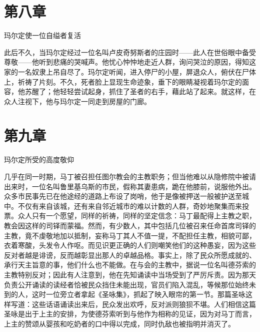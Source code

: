 \section{第八章}

玛尔定使一位自缢者复活\par

此后不久，当玛尔定经过一位名叫卢皮奇努斯者的庄园时——此人在世俗眼中备受尊敬——他听到悲痛的哭喊声。他忧心忡忡地走近人群，询问哭泣的原因，得知这家的一名奴隶上吊自尽了。玛尔定听闻，进入停尸的小屋，屏退众人，俯伏在尸体上，祈祷了片刻。不久，死者脸上显现生命迹象，垂下的眼睛凝视着玛尔定的面容，他苏醒了；他轻轻尝试起身，抓住了圣者的右手，藉此站了起来。就这样，在众人注视下，他与玛尔定一同走到房屋的门廊。\par


\section{第九章}

玛尔定所受的高度敬仰\par

几乎在同一时期，马丁被召担任图尔教会的主教职务；但当他难以从隐修院中被请出来时，一位名叫鲁里基乌斯的市民，假称其妻患病，跪在他膝前，说服他外出。众多市民事先已在他途经的道路上布设了岗哨，他于是像被押送一般被护送至城中。不仅有来自该城，还有来自邻近城市的难以计数的人群，奇妙地聚集而来投票。众人只有一个愿望，同样的祈祷，同样的坚定信念：马丁最配得上主教之职，教会因这样的司铎而蒙福。然而，有少数人，其中包括几位被召来任命首席司铎的主教，竟不虔敬地加以抵制，妄称马丁其人不值一提，不配担任主教，相貌可鄙，衣着寒酸，头发令人作呕。而见识更正确的人们则嘲笑他们的这种愚妄，因为这些反对者越是诽谤，反而越彰显出那人的卓越品格。事实上，除了民众所愿成就的、承行天主旨意的事，他们什么也不能做。在与会的主教中，据说一位名叫德芬索的主教特别反对；因此有人注意到，他在先知诵读中当场受到了严厉斥责。因为那天负责公开诵读的读经者恰被民众挡住未能出现，官员们陷入混乱，等候那位始终未到的人，这时一位旁立者拿起《圣咏集》，抓起了映入眼帘的第一节。那篇圣咏这样写道：这些话语诵读出来后，民众发出欢呼，反对派则狼狈不堪。人们相信这篇圣咏是出于上主的安排，为使德芬索听到与他作为相称的见证，因为对马丁而言，上主的赞颂从婴孩和吃奶者的口中得以完成，同时仇敌也被指明并消灭了。\par


